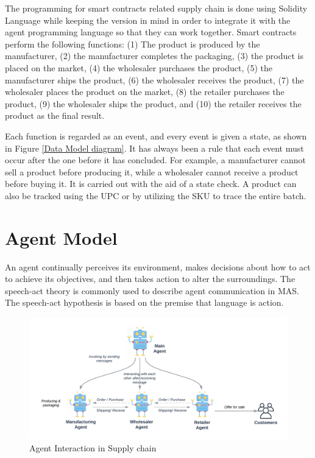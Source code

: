 \vspace{.5cm}

The programming for smart contracts related supply chain is done using Solidity Language while keeping the version in mind in order to integrate it with the agent programming language so that they can work together. Smart contracts perform the following functions: (1) The product is produced by the manufacturer, (2) the manufacturer completes the packaging, (3) the product is placed on the market, (4) the wholesaler purchases the product, (5) the manufacturer ships the product, (6) the wholesaler receives the product, (7) the wholesaler places the product on the market, (8) the retailer purchases the product, (9) the wholesaler ships the product, and (10) the retailer receives the product as the final result.

\vspace{.5cm}

Each function is regarded as an event, and every event is given a state, as shown in Figure \ref{Data Model diagram}. It has always been a rule that each event must occur after the one before it has concluded. For example, a manufacturer cannot sell a product before producing it, while a wholesaler cannot receive a product before buying it. It is carried out with the aid of a state check. A product can also be tracked using the \ac{UPC} or by utilizing the \ac{SKU} to trace the entire batch.

\section{Agent Model}

An agent continually perceives its environment, makes decisions about how to act to achieve its objectives, and then takes action to alter the surroundings. The speech-act theory is commonly used to describe agent communication in \ac{MAS}. The speech-act hypothesis is based on the premise that language is action.

\vspace{.5cm}

\begin{figure}[h]
    \centering
      \includegraphics[width=\linewidth]{includes/figures/agent.png} 
      \caption{Agent Interaction in Supply chain}
      \label{Agent Interaction}
    \end{figure}
  

